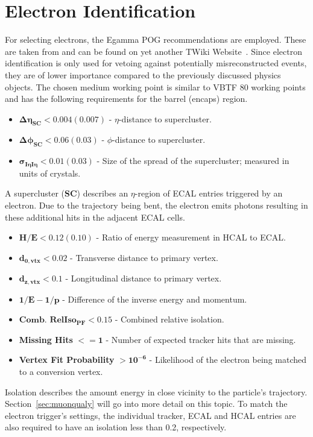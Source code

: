 \section{Electron Identification}
\label{sec:eleid}

For selecting electrons, the Egamma POG recommendations are employed. These are taken from and can be found on yet another TWiki Website~\cite{egammaid}. Since electron identification is only used for vetoing against potentially misreconstructed events, they are of lower importance compared to the previously discussed physics objects. The chosen medium working point is similar to VBTF 80 working points and has the following requirements for the barrel (encaps) region. 


\begin{itemize}
\item $\mathbf{\Delta \eta_{\textbf{SC}} < 0.004 (0.007)}$ - $\eta$-distance to supercluster.
\item $\mathbf{\Delta \phi_{\textbf{SC}} < 0.06 (0.03)}$ - $\phi$-distance to supercluster.
\item $\mathbf{\sigma_{I\eta I\eta} < 0.01 (0.03)}$ - Size of the spread of the supercluster; measured in units of crystals.
\end{itemize}

A supercluster (\textbf{SC}) describes an $\eta$-region of ECAL entries triggered by an electron. Due to the trajectory being bent, the electron emits photons resulting in these additional hits in the adjacent ECAL cells.

\begin{itemize}
\item $\mathbf{H / E < 0.12 (0.10)}$ - Ratio of energy measurement in HCAL to ECAL.
\item $\mathbf{d_{0, \textbf{vtx}} < 0.02}$ - Transverse distance to primary vertex. 
\item $\mathbf{d_{z, \textbf{vtx}} < 0.1}$ - Longitudinal distance to primary vertex.
\item $\mathbf{1/E - 1/p}$ - Difference of the inverse energy and momentum.
\item $\mathbf{\textbf{Comb. RelIso}_{\textbf{PF}} < 0.15}$ - Combined relative isolation.
\item \textbf{Missing Hits} $\mathbf{<= 1}$ - Number of expected tracker hits that are missing.
\item \textbf{Vertex Fit Probability} $\mathbf{> 10^{-6}}$ - Likelihood of the electron being matched to a conversion vertex.
\end{itemize}

Isolation describes the amount energy in close vicinity to the particle's trajectory. Section~\ref{sec:muonqualy} will go into more detail on this topic. To match the electron trigger's settings, the individual tracker, ECAL and HCAL entries are also required to have an isolation less than 0.2, respectively.

